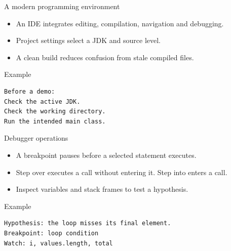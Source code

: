 \documentclass[10pt,aspectratio=169]{beamer}
\begin{document}
\begin{frame}[fragile,t]{A modern programming environment}
\begin{itemize}
\item An IDE integrates editing, compilation, navigation and debugging.
\item Project settings select a JDK and source level.
\item A clean build reduces confusion from stale compiled files.
\end{itemize}
\vspace{1mm}\begin{block}{Example}
\begin{lstlisting}
Before a demo:
Check the active JDK.
Check the working directory.
Run the intended main class.
\end{lstlisting}
\end{block}
\end{frame}

\begin{frame}[fragile,t]{Debugger operations}
\begin{itemize}
\item A breakpoint pauses before a selected statement executes.
\item Step over executes a call without entering it. Step into enters a call.
\item Inspect variables and stack frames to test a hypothesis.
\end{itemize}
\vspace{1mm}\begin{block}{Example}
\begin{lstlisting}
Hypothesis: the loop misses its final element.
Breakpoint: loop condition
Watch: i, values.length, total
\end{lstlisting}
\end{block}
\end{frame}
\end{document}
